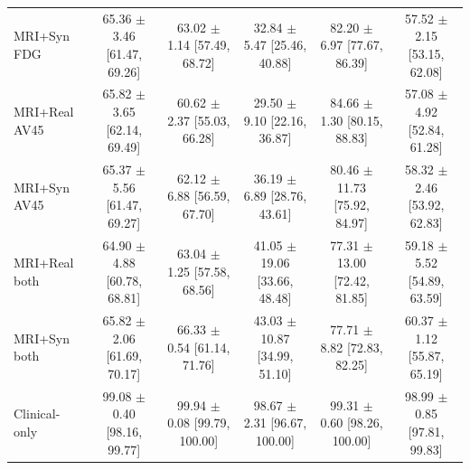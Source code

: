 \documentclass{article}
\begin{document}
\begin{landscape}
\begin{longtable}{lccccc}
MRI+Syn FDG & \shortstack{65.36 $\pm$ 3.46\\{}[61.47, 69.26]} & \shortstack{63.02 $\pm$ 1.14\\{}[57.49, 68.72]} & \shortstack{32.84 $\pm$ 5.47\\{}[25.46, 40.88]} & \shortstack{82.20 $\pm$ 6.97\\{}[77.67, 86.39]} & \shortstack{57.52 $\pm$ 2.15\\{}[53.15, 62.08]} \\
MRI+Real AV45 & \shortstack{65.82 $\pm$ 3.65\\{}[62.14, 69.49]} & \shortstack{60.62 $\pm$ 2.37\\{}[55.03, 66.28]} & \shortstack{29.50 $\pm$ 9.10\\{}[22.16, 36.87]} & \shortstack{84.66 $\pm$ 1.30\\{}[80.15, 88.83]} & \shortstack{57.08 $\pm$ 4.92\\{}[52.84, 61.28]} \\
MRI+Syn AV45 & \shortstack{65.37 $\pm$ 5.56\\{}[61.47, 69.27]} & \shortstack{62.12 $\pm$ 6.88\\{}[56.59, 67.70]} & \shortstack{36.19 $\pm$ 6.89\\{}[28.76, 43.61]} & \shortstack{80.46 $\pm$ 11.73\\{}[75.92, 84.97]} & \shortstack{58.32 $\pm$ 2.46\\{}[53.92, 62.83]} \\
MRI+Real both & \shortstack{64.90 $\pm$ 4.88\\{}[60.78, 68.81]} & \shortstack{63.04 $\pm$ 1.25\\{}[57.58, 68.56]} & \shortstack{41.05 $\pm$ 19.06\\{}[33.66, 48.48]} & \shortstack{77.31 $\pm$ 13.00\\{}[72.42, 81.85]} & \shortstack{59.18 $\pm$ 5.52\\{}[54.89, 63.59]} \\
MRI+Syn both & \shortstack{65.82 $\pm$ 2.06\\{}[61.69, 70.17]} & \shortstack{66.33 $\pm$ 0.54\\{}[61.14, 71.76]} & \shortstack{43.03 $\pm$ 10.87\\{}[34.99, 51.10]} & \shortstack{77.71 $\pm$ 8.82\\{}[72.83, 82.25]} & \shortstack{60.37 $\pm$ 1.12\\{}[55.87, 65.19]} \\
Clinical-only & \shortstack{99.08 $\pm$ 0.40\\{}[98.16, 99.77]} & \shortstack{99.94 $\pm$ 0.08\\{}[99.79, 100.00]} & \shortstack{98.67 $\pm$ 2.31\\{}[96.67, 100.00]} & \shortstack{99.31 $\pm$ 0.60\\{}[98.26, 100.00]} & \shortstack{98.99 $\pm$ 0.85\\{}[97.81, 99.83]} \\

\end{longtable}
\end{landscape}
\end{document}
